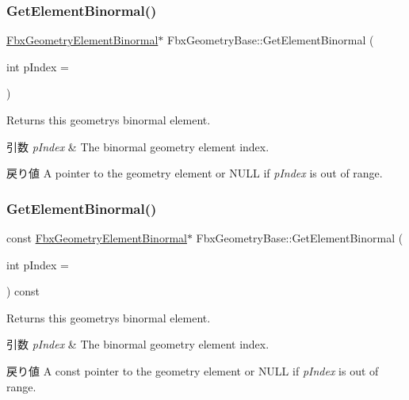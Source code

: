 \subsubsection{\texorpdfstring{Get\+Element\+Binormal()}{GetElementBinormal()}\hspace{0.1cm}{\footnotesize\ttfamily [1/2]}}
{\footnotesize\ttfamily \hyperlink{fbxlayer_8h_a066e30a64eb051458583b656a651e90b}{Fbx\+Geometry\+Element\+Binormal}$\ast$ Fbx\+Geometry\+Base\+::\+Get\+Element\+Binormal (\begin{DoxyParamCaption}\item[{int}]{p\+Index = {} }\end{DoxyParamCaption})}

Returns this geometry\textquotesingle{}s binormal element. 
\begin{DoxyParams}{引数}
{\em p\+Index} & The binormal geometry element index. \\
\hline
\end{DoxyParams}
\begin{DoxyReturn}{戻り値}
A pointer to the geometry element or {\ttfamily N\+U\+LL} if {\itshape p\+Index} is out of range. 
\end{DoxyReturn}
\mbox{\label{class_fbx_geometry_base_a12bc9aca7ec57790db96fa47219c559c}} 
\subsubsection{\texorpdfstring{Get\+Element\+Binormal()}{GetElementBinormal()}\hspace{0.1cm}{\footnotesize\ttfamily [2/2]}}
{\footnotesize\ttfamily const \hyperlink{fbxlayer_8h_a066e30a64eb051458583b656a651e90b}{Fbx\+Geometry\+Element\+Binormal}$\ast$ Fbx\+Geometry\+Base\+::\+Get\+Element\+Binormal (\begin{DoxyParamCaption}\item[{int}]{p\+Index = {} }\end{DoxyParamCaption}) const}

Returns this geometry\textquotesingle{}s binormal element. 
\begin{DoxyParams}{引数}
{\em p\+Index} & The binormal geometry element index. \\
\hline
\end{DoxyParams}
\begin{DoxyReturn}{戻り値}
A const pointer to the geometry element or {\ttfamily N\+U\+LL} if {\itshape p\+Index} is out of range. 
\end{DoxyReturn}
\mbox{\label{class_fbx_geometry_base_a04500774d4c9bfc97418f45aff63404e}} 
